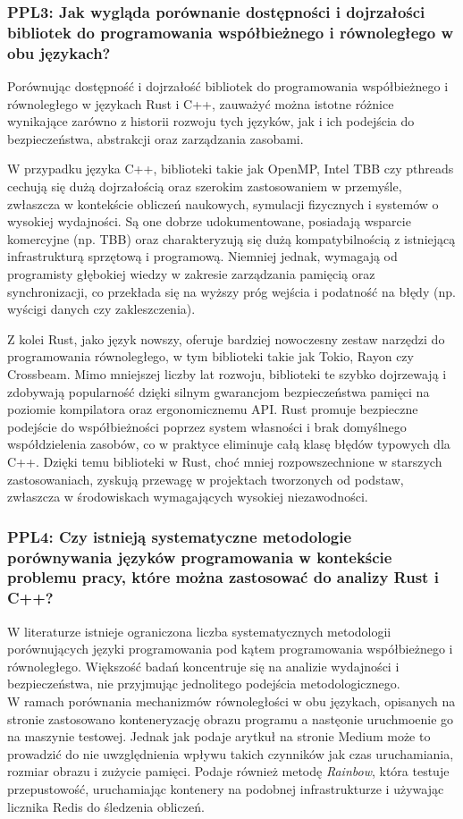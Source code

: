 \subsubsection{PPL3: Jak wygląda porównanie dostępności i dojrzałości bibliotek do programowania współbieżnego i równoległego w obu językach?}
Porównując dostępność i dojrzałość bibliotek do programowania współbieżnego i równoległego w językach Rust i C++, zauważyć można istotne różnice wynikające zarówno z historii rozwoju tych języków, jak i ich podejścia do bezpieczeństwa, abstrakcji oraz zarządzania zasobami.

W przypadku języka C++, biblioteki takie jak OpenMP, Intel TBB czy pthreads cechują się dużą dojrzałością oraz szerokim zastosowaniem w przemyśle, zwłaszcza w kontekście obliczeń naukowych, symulacji fizycznych i systemów o wysokiej wydajności. Są one dobrze udokumentowane, posiadają wsparcie komercyjne (np. TBB) oraz charakteryzują się dużą kompatybilnością z istniejącą infrastrukturą sprzętową i programową. Niemniej jednak, wymagają od programisty głębokiej wiedzy w zakresie zarządzania pamięcią oraz synchronizacji, co przekłada się na wyższy próg wejścia i podatność na błędy (np. wyścigi danych czy zakleszczenia).

Z kolei Rust, jako język nowszy, oferuje bardziej nowoczesny zestaw narzędzi do programowania równoległego, w tym biblioteki takie jak Tokio, Rayon czy Crossbeam. Mimo mniejszej liczby lat rozwoju, biblioteki te szybko dojrzewają i zdobywają popularność dzięki silnym gwarancjom bezpieczeństwa pamięci na poziomie kompilatora oraz ergonomicznemu API. Rust promuje bezpieczne podejście do współbieżności poprzez system własności  i brak domyślnego współdzielenia zasobów, co w praktyce eliminuje całą klasę błędów typowych dla C++. Dzięki temu biblioteki w Rust, choć mniej rozpowszechnione w starszych zastosowaniach, zyskują przewagę w projektach tworzonych od podstaw, zwłaszcza w środowiskach wymagających wysokiej niezawodności.

\subsubsection{PPL4: Czy istnieją systematyczne metodologie porównywania języków programowania w kontekście problemu pracy, które można zastosować do analizy Rust i C++?}
W literaturze istnieje ograniczona liczba systematycznych metodologii porównujących języki programowania pod kątem programowania współbieżnego i równoległego. Większość badań koncentruje się na analizie wydajności i bezpieczeństwa, nie przyjmując jednolitego podejścia metodologicznego.\\
W ramach porównania mechanizmów równoległości w obu językach, opisanych na stronie \cite{parallelrustcppIntroductionComparing} zastosowano konteneryzację obrazu programu a nastęonie uruchmoenie go na maszynie testowej. Jednak jak podaje arytkuł na stronie Medium \cite{rainbow} może to prowadzić do nie uwzględnienia wpływu takich czynników jak czas uruchamiania, rozmiar obrazu i zużycie pamięci. Podaje również metodę \textit{Rainbow}, która testuje przepustowość, uruchamiając kontenery na podobnej infrastrukturze i używając licznika Redis do śledzenia obliczeń.

